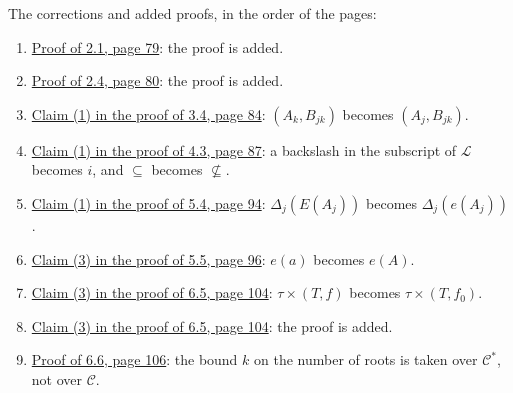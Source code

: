The corrections and added proofs, in the order of the pages:
\begin{enumerate}\setlength{\itemsep}{1pt}
\item {}\hyperref[fix:2.1-proof-added]{Proof of 2.1, page 79}: the proof is added.
\item {}\hyperref[fix:2.4-proof-added]{Proof of 2.4, page 80}: the proof is added.
\item {}\hyperref[fix:3.4-claim1]{Claim (1) in the proof of 3.4, page 84}: $(A_k, B_{jk})$
becomes $(A_j, B_{jk})$.
\item {}\hyperref[fix:4.3-claim1]{Claim (1) in the proof of 4.3, page 87}: a backslash in the
subscript of $\mathscr{L}$ becomes $i$, and $\subseteq$ becomes $\not\subseteq$.
\item {}\hyperref[fix:5.4-claim1]{Claim (1) in the proof of 5.4, page 94}: $\Delta_j(E(A_j))$
becomes $\Delta_j(e(A_j))$.
\item {}\hyperref[fix:5.5-claim3]{Claim (3) in the proof of 5.5, page 96}: $e(a)$ becomes $e(A)$.
\item {}\hyperref[fix:6.5-claim3-f0]{Claim (3) in the proof of 6.5, page 104}: $\tau \times (T, f)$
becomes $\tau \times (T, f_0)$.
\item {}\hyperref[fix:6.5-claim3-proof-added]{Claim (3) in the proof of 6.5, page 104}: the proof is
added.
\item {}\hyperref[fix:6.6-proof]{Proof of 6.6, page 106}: the bound $k$ on the number of roots is
taken over $\mathscr{C}^*$, not over $\mathscr{C}$.
\end{enumerate}
